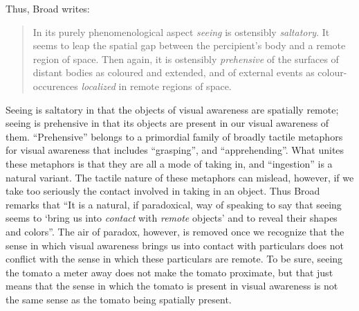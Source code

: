 \documentclass[12pt]{article}
\begin{document}
Thus, Broad writes:
\begin{quote}
    In its purely phenomenological aspect \emph{seeing} is ostensibly \emph{saltatory}. It seems to leap the spatial gap between the percipient's body and a remote region of space. Then again, it is ostensibly \emph{prehensive} of the surfaces of distant bodies as coloured and extended, and of external events as colour-occurences \emph{localized} in remote regions of space.
\end{quote}
Seeing is saltatory in that the objects of visual awareness are spatially remote; seeing is prehensive in that its objects are present in our visual awareness of them. ``Prehensive'' belongs to a primordial family of broadly tactile metaphors for visual awareness that includes ``grasping'', and ``apprehending''. What unites these metaphors is that they are all a mode of taking in, and ``ingestion'' is a natural variant. The tactile nature of these metaphors can mislead, however, if we take too seriously the contact involved in taking in an object. Thus Broad remarks that ``It is a natural, if paradoxical, way of speaking to say that seeing seems to `bring us into \emph{contact} with \emph{remote} objects' and to reveal their shapes and colors''. The air of paradox, however, is removed once we recognize that the sense in which visual awareness brings us into contact with particulars does not conflict with the sense in which these particulars are remote. To be sure, seeing the tomato a meter away does not make the tomato proximate, but that just means that the sense in which the tomato is present in visual awareness is not the same sense as the tomato being spatially present.
\end{document}
